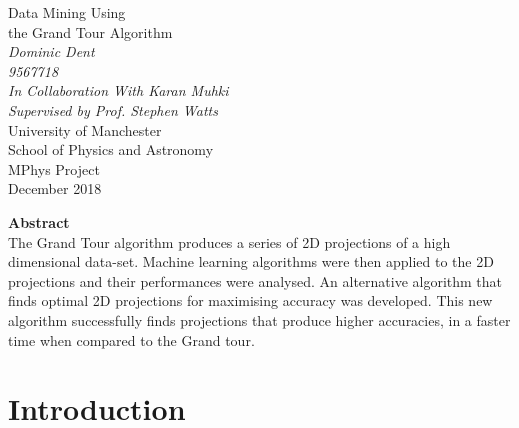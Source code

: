 \documentclass[a4paper,11pt,twoside]{article}
\begin{document}
\pagestyle{myStylePage}




\begin{titlepage} %
\begin{center} %


{\Huge Data Mining Using}\\[0.4cm]
{\Huge the Grand Tour Algorithm}\\[0.8cm] %
\textit{Dominic Dent}~\\[0.3cm] %
\textit{9567718}~\\[0.3cm]
\textit{In Collaboration With Karan Muhki}~\\[0.3cm]
\textit{Supervised by Prof. Stephen Watts}~\\[0.3cm]
University of Manchester~\\[0.3cm]
School of Physics and Astronomy~\\[0.3cm]
MPhys Project~\\[0.3cm]
December 2018~\\[2cm]

\vfill
\end{center}

{\Large \textbf{Abstract}}~\\[0.3cm]
The Grand Tour algorithm produces a series of 2D projections of a high dimensional data-set. Machine learning algorithms were then applied to the 2D projections and their performances were analysed. An alternative algorithm that finds optimal 2D projections for maximising accuracy was developed. This new algorithm successfully finds projections that produce higher accuracies, in a faster time when compared to the Grand tour.

\end{titlepage}
\clearpage
{} %
\setcounter{page}{2} %

\newpage %
\tableofcontents

\newpage

\section{Introduction}
\end{document}

